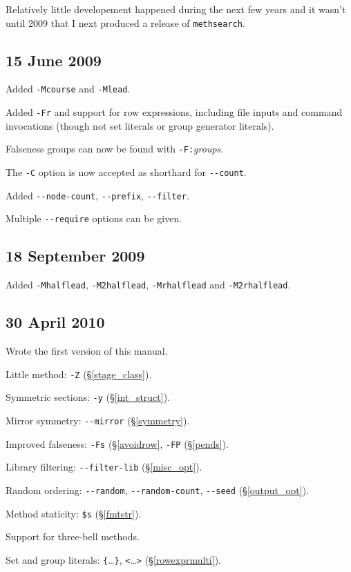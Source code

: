 \documentclass[a4paper,11pt,oneside]{book}
\def\methsearch{\texttt{meth\-search}}
\newcommand{\sref}[1]{\hyperref[#1]{\S\ref{#1}}}
\begin{document}
Relatively little developement happened during the next few years 
and it wasn't until 2009 that I next produced a release of \methsearch.

\subsection{15 June 2009}
\begin{list}{}{\leftmargin=1em}
\item Added \verb+-Mcourse+ and \verb+-Mlead+.
\item Added \verb+-Fr+ and support for row expressions, including
file inputs and command invocations (though not set literals or group 
generator literals).
\item Falseness groups can now be found with \verb+-F:+\textit{groups}.
\item The \verb+-C+ option is now accepted as shorthard for \verb+--count+.
\item Added \verb+--node-count+, \verb+--prefix+, \verb+--filter+.
\item Multiple \verb+--require+ options can be given.
\end{list}

\subsection{18 September 2009}
\begin{list}{}{\leftmargin=1em}
\item Added \verb+-Mhalflead+, \verb+-M2halflead+, \verb+-Mrhalflead+
and \verb+-M2rhalflead+.
\end{list}

\subsection{30 April 2010}
\begin{list}{}{\leftmargin=1em}
\item Wrote the first version of this manual.
\item Little method: \verb+-Z+ (\sref{stage_class}).
\item Symmetric sections: \verb+-y+ (\sref{int_struct}).
\item Mirror symmetry: \verb+--mirror+ (\sref{symmetry}).
\item Improved falseness: \verb+-Fs+ (\sref{avoidrow}, 
  \verb+-FP+ (\sref{pends}).
\item Library filtering: \verb+--filter-lib+ (\sref{misc_opt}).
\item Random ordering: \verb+--random+, \verb+--random-count+, \verb+--seed+
  (\S\ref{output_opt}).
\item Method staticity: \verb+$s+ (\sref{fmtstr}).
\item Support for three-bell methods.
\item Set and group literals: \verb+{+\ldots\verb+}+, \verb+<+\ldots\verb+>+
  (\sref{rowexprmulti}).
\end{list}
\end{document}
